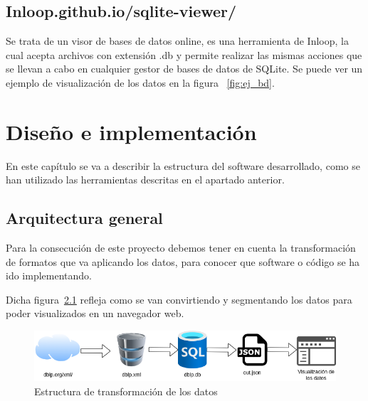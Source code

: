 \documentclass[a4paper, 12pt]{book}
\begin{document}
\section{Inloop.github.io/sqlite-viewer/}

Se trata de un visor de bases de datos online, es una herramienta de Inloop, la cual acepta archivos con extensión .db y permite realizar las mismas acciones que se llevan a cabo en cualquier gestor de bases de datos de SQLite. Se puede ver un ejemplo de visualización de los datos en la figura ~\ref{fig:ej_bd}.


\cleardoublepage
\chapter{Diseño e implementación}
\label{sec:diseno}

En este capítulo se va a describir la estructura del software desarrollado, como se han utilizado las herramientas descritas en el apartado anterior.

\section{Arquitectura general} 
\label{sec:arquitectura}

Para la consecución de este proyecto debemos tener en cuenta la transformación de formatos que va aplicando los datos, para conocer que software o código se ha ido implementando.


Dicha figura~\ref{fig:arquitectura} refleja como se van convirtiendo y segmentando los datos para poder visualizados en un navegador web.

\begin{figure}[h]
  \centering
  \includegraphics[width=16cm, keepaspectratio]{img/esquemadatos_com.png}
  \caption{Estructura de transformación de los datos}
  \label{fig:arquitectura}
\end{figure}
\end{document}
